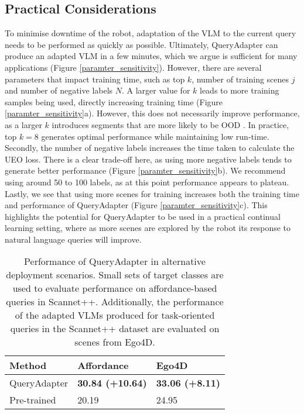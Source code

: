 \vspace{-0.3em}
\subsection{Practical Considerations}
To minimise downtime of the robot, adaptation of the VLM to the current query needs to be performed as quickly as possible. Ultimately, QueryAdapter can produce an adapted VLM in a few minutes, which we argue is sufficient for many applications (Figure \ref{paramter_sensitivity}). However, there are several parameters that impact training time, such as top $k$, number of training scenes $j$ and number of negative labels $N$. A larger value for $k$ leads to more training samples being used, directly increasing training time (Figure \ref{paramter_sensitivity}a). However, this does not necessarily improve performance, as a larger $k$ introduces segments that are more likely to be OOD \cite{upl}. In practice, top $k=8$ generates optimal performance while maintaining low run-time. Secondly, the number of negative labels increases the time taken to calculate the UEO loss. There is a clear trade-off here, as using more negative labels tends to generate better performance (Figure \ref{paramter_sensitivity}b). We recommend using around 50 to 100 labels, as at this point performance appears to plateau. Lastly, we see that using more scenes for training increases both the training time and performance of QueryAdapter (Figure \ref{paramter_sensitivity}c). 
This highlights the potential for QueryAdapter to be used in a practical continual learning setting, where as more scenes are explored by the robot its response to natural language queries will improve. 

\begin{table}[t]
\centering
\caption{Performance of QueryAdapter in alternative deployment scenarios. Small sets of target classes are used to evaluate performance on affordance-based queries in Scannet++. Additionally, the performance of the adapted VLMs produced for task-oriented queries in the Scannet++ dataset are evaluated on scenes from Ego4D. }
\begin{tabular}{l|l|l}
\hline
Method & Affordance  & Ego4D \\ \hline
QueryAdapter   & \textbf{30.84 (+10.64)} & \textbf{33.06 (+8.11)} \\ \hline

Pre-trained   &  20.19  & 24.95   \\ \hline
\end{tabular}
\vspace{-1.5em}
\label{tab:other}
\end{table}

